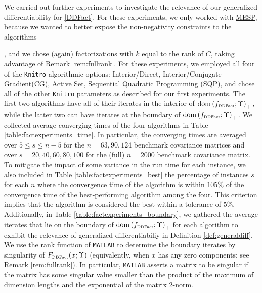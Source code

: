 \documentclass[smallextended]{svjour3hack}       %
\newcommand{\jon}[1]{\noindent{\color{cyan}[Jon:]\ {#1}}}
\newcommand{\zc}[1]{\noindent{\color{red}[Zhongzhu:]\ {#1}}}
\newcommand{\mf}[1]{\noindent{\color{green}[Marcia:]\ {#1}}}
\DeclareMathOperator{\dom}{dom}
\begin{document}
{We carried out further experiments to investigate the relevance of our generalized differentiability for \ref{DDFact}.
For these experiments,
we only worked with \hyperlink{MESP}{MESP},
because we wanted to better expose the non-negativity constraints to the algorithms{,
and we chose (again) factorizations
with $k$ equal to the rank of $C$, taking advantage of Remark \ref{rem:fullrank}.
For these experiments, we employed  all four of the \texttt{Knitro} algorithmic options:
Interior/Direct, Interior/Conjugate-Gradient(CG),
Active Set, Sequential Quadratic Programming (SQP), and chose all of the other \texttt{Knitro}
parameters as described for our first experiments.
The first two algorithms have all of their iterates in the interior of $ \dom\left(f_{{\tiny\mbox{DDFact}}}; \Upsilon\right)_+$\,,
while the latter two can have  iterates at the boundary of $\dom\left(f_{{\tiny\mbox{DDFact}}}; \Upsilon\right)_+$\,.
We collected average converging times of the four algorithms in Table \ref{table:factexperiments_time}.
  In particular, the converging times are averaged over $5\le s\le n-5$ for the $n=63, 90, 124$ benchmark  covariance matrices and over $s= 20, 40, 60, 80, 100$ for the (full) $n=2000$ benchmark  covariance matrix.
  To mitigate the impact of some variance in the run time for each instance, we also included in Table \ref{table:factexperiments_best} the percentage of instances $s$ for each $n$ where the convergence time of the algorithm is within $105\%$ of the convergence time of the best-performing algorithm among the four. This criterion implies that the algorithm is considered the best within a tolerance of $5\%$. Additionally, in Table \ref{table:factexperiments_boundary}, we gathered the average iterates that lie on the boundary of $\dom\left(f_{{\tiny\mbox{DDFact}}}; \Upsilon\right)_+$ for each algorithm to exhibit the relevance of generalized differentiabiliy in Definition \ref{def:generaldiff}. We use the rank function of \texttt{MATLAB} to determine the boundary iterates
  by singularity of $F_{{\tiny\mbox{DDFact}}}(x;\Upsilon)$ (equivalently, when $x$ has any zero components; see Remark \ref{rem:fullrank}). In particular, \texttt{MATLAB} asserts a matrix to be singular if the matrix has some singular value smaller than the product of the maximum of dimension lengths and the exponential of the matrix 2-norm.

}}
\end{document}
